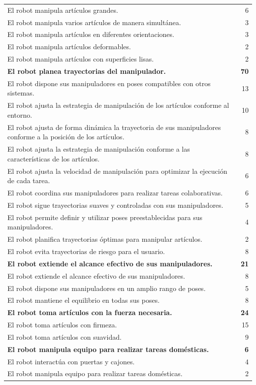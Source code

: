 \begin{longtable}{@{}>{\raggedright\arraybackslash}p{} r@{}}
El robot manipula artículos grandes. & 6 \\
El robot manipula varios artículos de manera simultánea. & 3 \\
El robot manipula artículos en diferentes orientaciones. & 3 \\
El robot manipula artículos deformables. & 2 \\
El robot manipula artículos con superficies lisas. & 2 \\
\rowcolor{nsec} \textbf{El robot planea trayectorias del manipulador.} & \textbf{70} \\
El robot dispone sus manipuladores en poses compatibles con otros sistemas. & 13 \\
El robot ajusta la estrategia de manipulación de los artículos conforme al entorno. & 10 \\
El robot ajusta de forma dinámica la trayectoria de sus manipuladores conforme a la posición de los artículos. & 8 \\
El robot ajusta la estrategia de manipulación conforme a las características de los artículos. & 8 \\
El robot ajusta la velocidad de manipulación para optimizar la ejecución de cada tarea. & 6 \\
El robot coordina sus manipuladores para realizar tareas colaborativas. & 6 \\
El robot sigue trayectorias suaves y controladas con sus manipuladores. & 5 \\
El robot permite definir y utilizar poses preestablecidas para sus manipuladores. & 4 \\
El robot planifica trayectorias óptimas para manipular artículos. & 2 \\
El robot evita trayectorias de riesgo para el usuario. & 8 \\
\rowcolor{nsec} \textbf{El robot extiende el alcance efectivo de sus manipuladores.} & \textbf{21} \\
El robot extiende el alcance efectivo de sus manipuladores. & 8 \\
El robot dispone sus manipuladores en un amplio rango de poses. & 5 \\
El robot mantiene el equilibrio en todas sus poses. & 8 \\
\rowcolor{nsec} \textbf{El robot toma artículos con la fuerza necesaria.} & \textbf{24} \\
El robot toma artículos con firmeza. & 15 \\
El robot toma artículos con suavidad. & 9 \\
\rowcolor{nsec} \textbf{El robot manipula equipo para realizar tareas domésticas.} & \textbf{6} \\
El robot interactúa con puertas y cajones. & 4 \\
El robot manipula equipo para realizar tareas domésticas. & 2 \\
\end{longtable}

